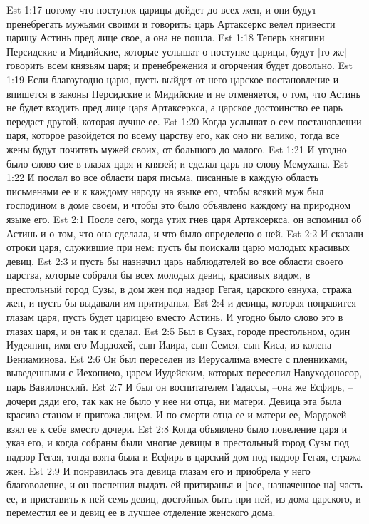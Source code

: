Est 1:17  потому что поступок царицы дойдет до всех жен, и они будут пренебрегать мужьями своими и говорить: царь Артаксеркс велел привести царицу Астинь пред лице свое, а она не пошла.
Est 1:18  Теперь княгини Персидские и Мидийские, которые услышат о поступке царицы, будут [то же] говорить всем князьям царя; и пренебрежения и огорчения будет довольно.
Est 1:19  Если благоугодно царю, пусть выйдет от него царское постановление и впишется в законы Персидские и Мидийские и не отменяется, о том, что Астинь не будет входить пред лице царя Артаксеркса, а царское достоинство ее царь передаст другой, которая лучше ее.
Est 1:20  Когда услышат о сем постановлении царя, которое разойдется по всему царству его, как оно ни велико, тогда все жены будут почитать мужей своих, от большого до малого.
Est 1:21  И угодно было слово сие в глазах царя и князей; и сделал царь по слову Мемухана.
Est 1:22  И послал во все области царя письма, писанные в каждую область письменами ее и к каждому народу на языке его, чтобы всякий муж был господином в доме своем, и чтобы это было объявлено каждому на природном языке его.
Est 2:1  После сего, когда утих гнев царя Артаксеркса, он вспомнил об Астинь и о том, что она сделала, и что было определено о ней.
Est 2:2  И сказали отроки царя, служившие при нем: пусть бы поискали царю молодых красивых девиц,
Est 2:3  и пусть бы назначил царь наблюдателей во все области своего царства, которые собрали бы всех молодых девиц, красивых видом, в престольный город Сузы, в дом жен под надзор Гегая, царского евнуха, стража жен, и пусть бы выдавали им притиранья,
Est 2:4  и девица, которая понравится глазам царя, пусть будет царицею вместо Астинь. И угодно было слово это в глазах царя, и он так и сделал.
Est 2:5  Был в Сузах, городе престольном, один Иудеянин, имя его Мардохей, сын Иаира, сын Семея, сын Киса, из колена Вениаминова.
Est 2:6  Он был переселен из Иерусалима вместе с пленниками, выведенными с Иехониею, царем Иудейским, которых переселил Навуходоносор, царь Вавилонский.
Est 2:7  И был он воспитателем Гадассы, --она же Есфирь, --дочери дяди его, так как не было у нее ни отца, ни матери. Девица эта была красива станом и пригожа лицем. И по смерти отца ее и матери ее, Мардохей взял ее к себе вместо дочери.
Est 2:8  Когда объявлено было повеление царя и указ его, и когда собраны были многие девицы в престольный город Сузы под надзор Гегая, тогда взята была и Есфирь в царский дом под надзор Гегая, стража жен.
Est 2:9  И понравилась эта девица глазам его и приобрела у него благоволение, и он поспешил выдать ей притиранья и [все, назначенное на] часть ее, и приставить к ней семь девиц, достойных быть при ней, из дома царского, и переместил ее и девиц ее в лучшее отделение женского дома.
